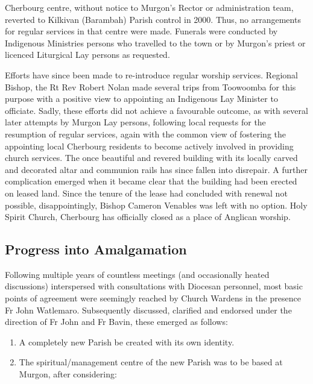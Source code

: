 Cherbourg centre, without notice to Murgon's Rector or administration team, reverted to Kilkivan (Barambah) Parish control in 2000. Thus, no arrangements for regular services in that centre were made. Funerals were conducted by Indigenous Ministries persons who travelled to the town or by Murgon's priest or licenced Liturgical Lay persons as requested.



Efforts have since been made to re-introduce regular worship services. Regional Bishop, the Rt Rev Robert Nolan made several trips from Toowoomba for this purpose with a positive view to appointing an Indigenous Lay Minister to officiate. Sadly, these efforts did not achieve a favourable outcome, as with several later attempts by Murgon Lay persons, following local requests for the resumption of regular services, again with the common view of fostering the appointing local Cherbourg residents to become actively involved in providing church services. The once beautiful and revered building with its locally carved and decorated altar and communion rails has since fallen into disrepair. A further complication emerged when it became clear that the building had been erected on leased land. Since the tenure of the lease had concluded with renewal not possible, disappointingly, Bishop Cameron Venables was left with no option. Holy Spirit Church, Cherbourg has officially closed as a place of Anglican worship.



\subsection{Progress into Amalgamation}



Following multiple years of countless meetings (and occasionally heated discussions) interspersed with consultations with Diocesan personnel, most basic points of agreement were seemingly reached by Church Wardens in the presence Fr John Watlemaro. Subsequently discussed, clarified and endorsed under the direction of Fr John and Fr Bavin, these emerged as follows:



\begin{enumerate}

\def\labelenumi{\arabic{enumi}.}

\item

  A completely new Parish be created with its own identity.

\item

  The spiritual/management centre of the new Parish was to be based at Murgon, after considering:

\end{enumerate}



